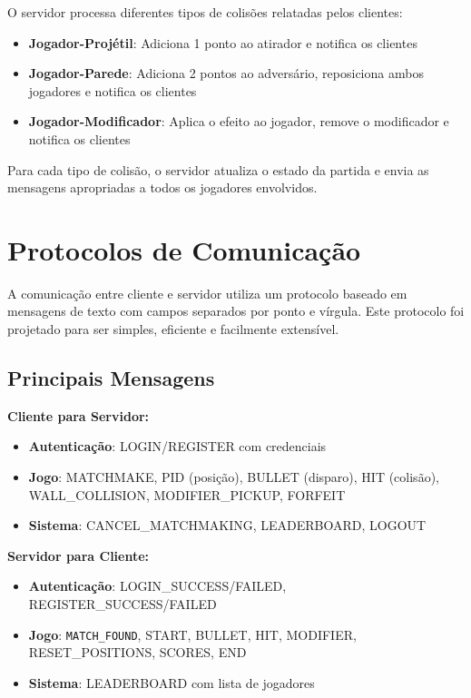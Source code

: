 \documentclass[12pt,a4paper]{report}
\begin{document}
O servidor processa diferentes tipos de colisões relatadas pelos clientes:

\begin{itemize}
    \item \textbf{Jogador-Projétil}: Adiciona 1 ponto ao atirador e notifica os clientes
    \item \textbf{Jogador-Parede}: Adiciona 2 pontos ao adversário, reposiciona ambos jogadores e notifica os clientes
    \item \textbf{Jogador-Modificador}: Aplica o efeito ao jogador, remove o modificador e notifica os clientes
\end{itemize}

Para cada tipo de colisão, o servidor atualiza o estado da partida e envia as mensagens apropriadas a todos os jogadores envolvidos.

\chapter{Protocolos de Comunicação}

A comunicação entre cliente e servidor utiliza um protocolo baseado em mensagens de texto com campos separados por ponto e vírgula. Este protocolo foi projetado para ser simples, eficiente e facilmente extensível.

\section{Principais Mensagens}

\textbf{Cliente para Servidor:}
\begin{itemize}
    \item \textbf{Autenticação}: LOGIN/REGISTER com credenciais
    \item \textbf{Jogo}: MATCHMAKE, PID (posição), BULLET (disparo), HIT (colisão), WALL\_COLLISION, MODIFIER\_PICKUP, FORFEIT
    \item \textbf{Sistema}: CANCEL\_MATCHMAKING, LEADERBOARD, LOGOUT
\end{itemize}

\textbf{Servidor para Cliente:}
\begin{itemize}
    \item \textbf{Autenticação}: LOGIN\_SUCCESS/FAILED, REGISTER\_SUCCESS/FAILED
    \item \textbf{Jogo}: \texttt{MATCH\_FOUND}, START, BULLET, HIT, MODIFIER, RESET\_POSITIONS, SCORES, END
    \item \textbf{Sistema}: LEADERBOARD com lista de jogadores
\end{itemize}
\end{document}
